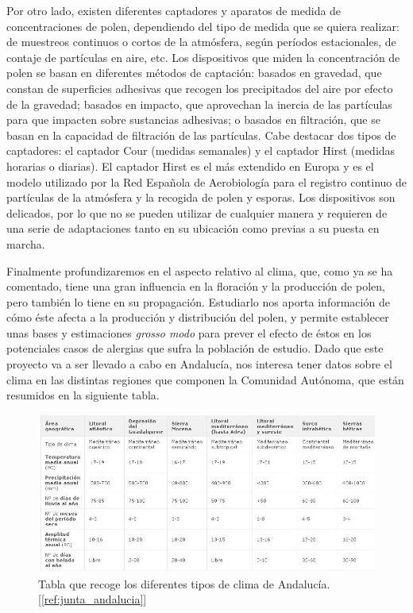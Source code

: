 \documentclass[12pt,oneside,a4paper]{article}
\numberwithin{figure}{section}
\begin{document}
Por otro lado, existen diferentes captadores y aparatos de medida de concentraciones de polen, dependiendo del tipo de medida que se quiera realizar: de muestreos continuos o cortos de la atmósfera, según períodos estacionales, de contaje de partículas en aire, etc. Los dispositivos que miden la concentración de polen se basan en diferentes métodos de captación: basados en gravedad, que constan de superficies adhesivas que recogen los precipitados del aire por efecto de la gravedad; basados en impacto, que aprovechan la inercia de las partículas para que impacten sobre sustancias adhesivas; o basados en filtración, que se basan en la capacidad de filtración de las partículas. Cabe destacar dos tipos de captadores: el captador Cour (medidas semanales) y el captador Hirst (medidas horarias o diarias). El captador Hirst es el más extendido en Europa y es el modelo utilizado por la Red Española de Aerobiología  para el registro continuo de partículas de la atmósfera y la recogida de polen y esporas. Los dispositivos son delicados, por lo que no se pueden utilizar de cualquier manera y requieren de una serie de adaptaciones tanto en su ubicación como previas a su puesta en marcha.

Finalmente profundizaremos en el aspecto relativo al clima, que, como ya se ha comentado, tiene una gran influencia en la floración y la producción de polen, pero también lo tiene en su propagación. Estudiarlo nos aporta información de cómo éste afecta a la producción y distribución del polen, y permite establecer unas bases y estimaciones \textit{grosso modo} para prever el efecto de éstos en los potenciales casos de alergias que sufra la población de estudio. Dado que este proyecto va a ser llevado a cabo en Andalucía, nos interesa tener datos sobre el clima en las distintas regiones que componen la Comunidad Autónoma, que están resumidos en la siguiente tabla.

\begin{figure}[H]
\begin{center}
\includegraphics[scale=.7]{tabla_clima.JPG}
\caption{Tabla que recoge los diferentes tipos de clima de Andalucía. [\ref{ref:junta_andalucia}]}
\label{fig:tabla_clima}
\end{center}
\end{figure}
\end{document}
